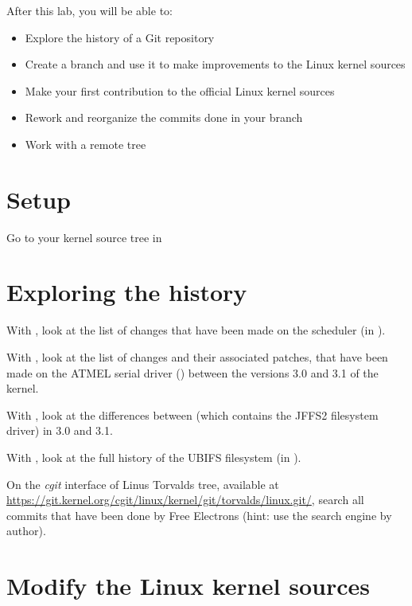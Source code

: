 
After this lab, you will be able to:

\begin{itemize}
\item Explore the history of a Git repository
\item Create a branch and use it to make improvements to the Linux kernel sources
\item Make your first contribution to the official Linux kernel sources
\item Rework and reorganize the commits done in your branch
\item Work with a remote tree 
\end{itemize}

\section{Setup}

Go to your kernel source tree in 

\section{Exploring the history}

With , look at the list of changes that have been made on the scheduler
(in ).

With , look at the list of changes and their associated
patches, that have been made on the ATMEL serial driver
() between the versions 3.0
and 3.1 of the kernel.

With , look at the differences between 
(which contains the JFFS2 filesystem driver) in 3.0 and 3.1.

With , look at the full history of the UBIFS filesystem (in
).

On the {\em cgit} interface of Linus Torvalds tree, available at
\url{https://git.kernel.org/cgit/linux/kernel/git/torvalds/linux.git/},
search all commits that have been done by Free Electrons (hint: use
the search engine by author).

\section{Modify the Linux kernel sources}


